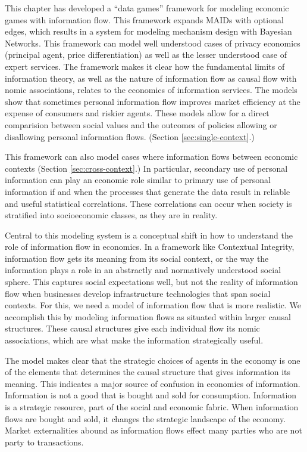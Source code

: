 \documentclass[../thesis.tex]{subfiles}
\begin{document}
This chapter has developed a ``data games'' framework for modeling
economic games with information flow.
This framework expands MAIDs with optional edges,
which results in a system for modeling mechanism
design with Bayesian Networks.
This framework can model well understood cases of
privacy economics (principal agent, price differentiation)
as well as the lesser understood case of expert services.
The framework makes it clear how the fundamental limits
of information theory, as well as the nature of information
flow as causal flow with nomic associations,
relates to the economics of information
services.
The models show that sometimes personal information flow
improves market efficiency at the expense of consumers
and riskier agents.
These models allow for a direct comparision between social
values and the outcomes of policies allowing or disallowing
personal information flows. (Section \ref{sec:single-context}.)

This framework can also model cases where information
flows between economic contexts
(Section \ref{sec:cross-context}.)
In particular, secondary use of personal information can
play an economic role similar to primary use of personal
information if and when the processes that generate
the data result in reliable and useful statistical correlations.
These correlations can occur when society is stratified into
socioeconomic classes, as they are in reality.

Central to this modeling system is a conceptual shift in
how to understand the role of information flow in economics.
In a framework like Contextual Integrity, information flow
gets its meaning from its social context, or the way
the information plays a role in an abstractly and normatively
understood social sphere.
This captures social expectations well, but not the reality
of information flow when businesses develop infrastructure
technologies that span social contexts.
For this, we need a model of information flow that is more
realistic.
We accomplish this by modeling information flows as situated
within larger causal structures.
These causal structures give each individual flow its
nomic associations, which are what make the information
strategically useful.

The model makes clear that the strategic choices of agents
in the economy is one of
the elements that determines the causal structure that gives
information its meaning.
This indicates a major source of confusion in economics of information.
Information is not a good that is bought and sold for consumption.
Information is a strategic resource, part of the social and economic fabric.
When information flows are bought and sold, it changes the
strategic landscape of the economy.
Market externalities abound as information flows effect many parties
who are not party to transactions.
\end{document}
